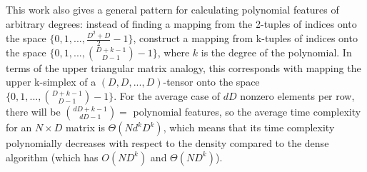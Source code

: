 \documentclass[11pt,onecolumn]{article}
\begin{document}
This work also gives a general pattern for calculating polynomial features of arbitrary degrees:
instead of finding a mapping from the 2-tuples of indices onto the space $\{0, 1, ..., \frac{D^2+D}{2}-1\}$,
construct a mapping from k-tuples of indices onto the space $\{0, 1, ..., \binom{D+k-1}{D-1}-1\}$, where $k$ is the degree of the polynomial.
In terms of the upper triangular matrix analogy, this corresponds with mapping the upper k-simplex of a $(D, D, ..., D)$-tensor onto
the space $\{0, 1, ..., \binom{D+k-1}{D-1}-1\}$. For the average case of $dD$ nonzero elements per row, 
there will be $\binom{dD+k-1}{dD-1} = $ polynomial features, so the average time complexity for an $N \times D$ matrix
is $\Theta(Nd^kD^k)$, which means that its time complexity polynomially decreases with respect to the density
compared to the dense algorithm (which has $O(ND^k)$ and $\Theta(ND^k)$).

\vskip 0.2in
{}

\end{document}
